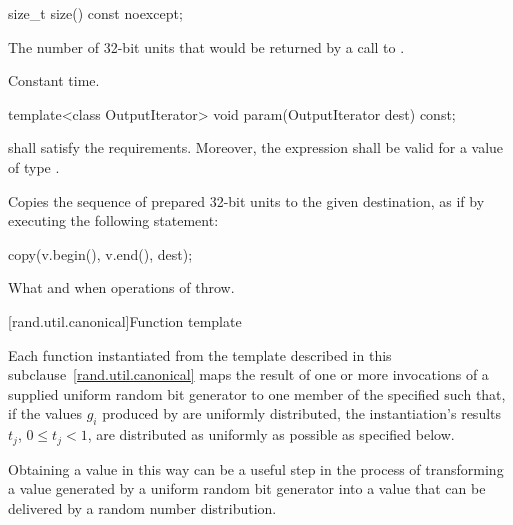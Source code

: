 %
\begin{itemdecl}
size_t size() const noexcept;
\end{itemdecl}

\begin{itemdescr}
\pnum\returns The number of 32-bit units
 that would be returned
 by a call to .

\pnum\complexity Constant time.
\end{itemdescr}

%
\begin{itemdecl}
template<class OutputIterator>
  void param(OutputIterator dest) const;
\end{itemdecl}

\begin{itemdescr}
\pnum\requires
   shall satisfy the
   requirements.
  Moreover,
  the expression
  shall be valid for a value  of type .

\pnum\effects Copies the sequence of prepared 32-bit units
 to the given destination,
 as if by executing the following statement:
\begin{codeblock}
copy(v.begin(), v.end(), dest);
\end{codeblock}

\pnum\throws
What and when  operations of  throw.
\end{itemdescr}


[rand.util.canonical]{Function template }%
%

\pnum
 Each function instantiated
 from the template
 described in this subclause~\ref{rand.util.canonical}
 maps the result of one or more invocations
 of a supplied uniform random bit generator 
 to one member
 of the specified 
 such that,
 if the values $g_i$
 produced by 
 are uniformly distributed,
 the instantiation's results
 $t_j$, $0 \leq t_j < 1$,
 are distributed as uniformly as possible
 as specified below.

\pnum
\begin{note}
 Obtaining a value in this way
 can be a useful step
 in the process of transforming
 a value generated by a uniform random bit generator
 into a value
 that can be delivered by a random number distribution.
\end{note}

